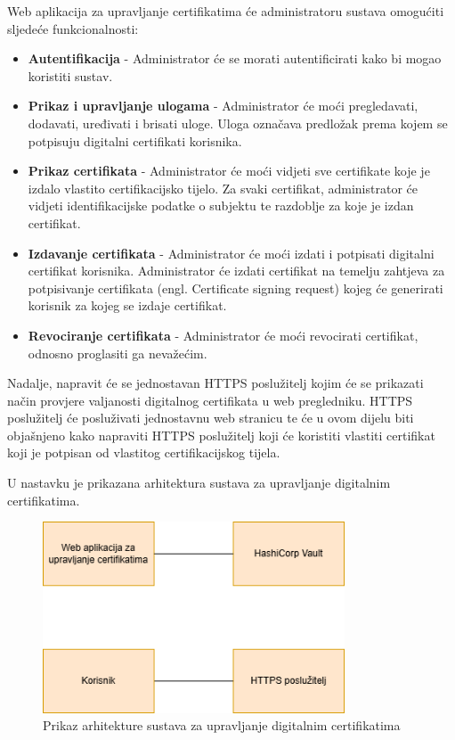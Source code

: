 \documentclass[]{foi}
\begin{document}
Web aplikacija za upravljanje certifikatima će administratoru sustava omogućiti sljedeće funkcionalnosti:
\begin{itemize}
    \item \textbf{Autentifikacija} - Administrator će se morati autentificirati kako bi mogao koristiti sustav.
    \item \textbf{Prikaz i upravljanje ulogama} - Administrator će moći pregledavati, dodavati, uređivati i brisati uloge.
          Uloga označava predložak prema kojem se potpisuju digitalni certifikati korisnika.
    \item \textbf{Prikaz certifikata} - Administrator će moći vidjeti sve certifikate koje je izdalo vlastito certifikacijsko tijelo.
          Za svaki certifikat, administrator će vidjeti identifikacijske podatke o subjektu te razdoblje za koje je izdan certifikat.
    \item \textbf{Izdavanje certifikata} - Administrator će moći izdati i potpisati digitalni certifikat korisnika.
          Administrator će izdati certifikat na temelju zahtjeva za potpisivanje certifikata (engl. Certificate signing request) kojeg će generirati korisnik za kojeg se izdaje certifikat.
    \item \textbf{Revociranje certifikata} - Administrator će moći revocirati certifikat, odnosno proglasiti ga nevažećim.
\end{itemize}

Nadalje, napravit će se jednostavan HTTPS poslužitelj kojim će se prikazati način provjere valjanosti digitalnog certifikata u web pregledniku.
HTTPS poslužitelj će posluživati jednostavnu web stranicu te će u ovom dijelu biti objašnjeno kako napraviti HTTPS poslužitelj koji će koristiti
vlastiti certifikat koji je potpisan od vlastitog certifikacijskog tijela.

\pagebreak

U nastavku je prikazana arhitektura sustava za upravljanje digitalnim certifikatima.

\begin{figure}[htbp]
    \centering
    \includegraphics[width=0.8\textwidth]{assets/arhitektura.png}
    \caption{Prikaz arhitekture sustava za upravljanje digitalnim certifikatima}
\end{figure}
\end{document}
